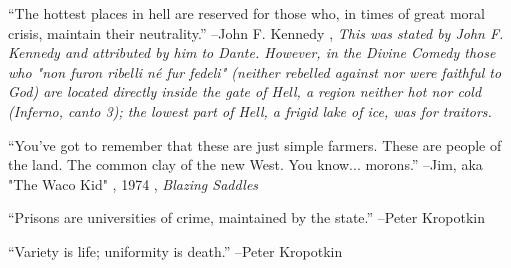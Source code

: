 \documentclass{article}%
\begin{document}
\linebreak%
\vspace{1mm}%
\begin{minipage}{\textwidth}%
\flushleft%
“The hottest places in hell are reserved for those who, in times of great moral crisis, maintain their neutrality.”%
\linebreak%
\vspace{1mm}%
–John F. Kennedy%
, \textit{This was stated by John F. Kennedy and attributed by him to Dante. However, in the Divine Comedy those who "non furon ribelli né fur fedeli" (neither rebelled against nor were faithful to God) are located directly inside the gate of Hell, a region neither hot nor cold (Inferno, canto 3); the lowest part of Hell, a frigid lake of ice, was for traitors.}%
\linebreak%
\vspace{1mm}%
\end{minipage}%
\linebreak%
\vspace{1mm}%
\begin{minipage}{\textwidth}%
\flushleft%
“You've got to remember that these are just simple farmers. These are people of the land. The common clay of the new West. You know... morons.”%
\linebreak%
\vspace{1mm}%
–Jim, aka "The Waco Kid"%
, 1974%
, \textit{Blazing Saddles}%
\linebreak%
\vspace{1mm}%
\end{minipage}%
\linebreak%
\vspace{1mm}%
\begin{minipage}{\textwidth}%
\flushleft%
“Prisons are universities of crime, maintained by the state.”%
\linebreak%
\vspace{1mm}%
–Peter Kropotkin%
\linebreak%
\vspace{1mm}%
\end{minipage}%
\linebreak%
\vspace{1mm}%
\begin{minipage}{\textwidth}%
\flushleft%
“Variety is life; uniformity is death.”%
\linebreak%
\vspace{1mm}%
–Peter Kropotkin%
\linebreak%
\vspace{1mm}%
\end{minipage}%
\end{document}
